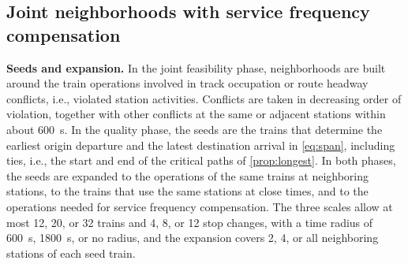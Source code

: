\subsection{Joint neighborhoods with service frequency compensation}\label{sec:joint}
\textbf{Seeds and expansion.} In the joint feasibility phase, neighborhoods are built around the train operations involved in track occupation or route headway conflicts, i.e., violated station activities. Conflicts are taken in decreasing order of violation, together with other conflicts at the same or adjacent stations within about 600~s. In the quality phase, the seeds are the trains that determine the earliest origin departure and the latest destination arrival in \eqref{eq:span}, including ties, i.e., the start and end of the critical paths of \cref{prop:longest}. In both phases, the seeds are expanded to the operations of the same trains at neighboring stations, to the trains that use the same stations at close times, and to the operations needed for service frequency compensation. The three scales allow at most 12, 20, or 32 trains and 4, 8, or 12 stop changes, with a time radius of 600~s, 1800~s, or no radius, and the expansion covers 2, 4, or all neighboring stations of each seed train.

